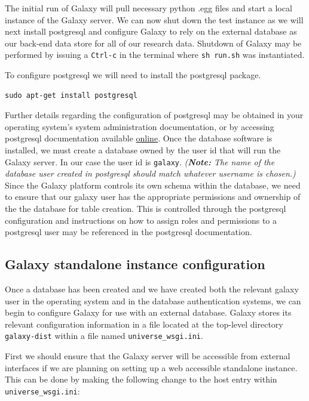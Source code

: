 \documentclass[a4paper,10pt]{article}
\begin{document}
The initial run of Galaxy will pull necessary python .egg files and start a local instance of the Galaxy server.  We can now shut down the test instance as we will next install postgresql and configure Galaxy to rely on the external database as our back-end data store for all of our research data.  Shutdown of Galaxy may be performed by issuing a \texttt{\footnotesize{Ctrl-c}} in the terminal where \texttt{\footnotesize{sh run.sh}} was instantiated.

To configure postgresql we will need to install the postgresql package.

\begin{lstlisting}
sudo apt-get install postgresql
\end{lstlisting}

Further details regarding the configuration of postgresql may be obtained in your operating system's system administration documentation, or by accessing postgresql documentation available \href{http://www.postgresql.org/}{online}.  Once the database software is installed, we must create a database owned by the user id that will run the Galaxy server.  In our case the user id is \texttt{\footnotesize{galaxy}}.  \textit{(\textbf{Note:} The name of the database user created in postgresql should match whatever username is chosen.)}  Since the Galaxy platform controls its own schema within the database, we need to ensure that our galaxy user has the appropriate permissions and ownership of the the database for table creation.  This is controlled through the postgresql configuration and instructions on how to assign roles and permissions to a postgresql user may be referenced in the postgresql documentation.

\subsection{Galaxy standalone instance configuration}
Once a database has been created and we have created both the relevant galaxy user in the operating system and in the database authentication systems, we can begin to configure Galaxy for use with an external database.
Galaxy stores its relevant configuration information in a file located at the top-level directory \texttt{\footnotesize{galaxy-dist}} within a file named \texttt{\footnotesize{universe\_wsgi.ini}}.

First we should ensure that the Galaxy server will be accessible from external interfaces if we are planning on setting up a web accessible standalone instance.  This can be done by making the following change to the host entry within \texttt{\footnotesize{universe\_wsgi.ini}}:
\end{document}

